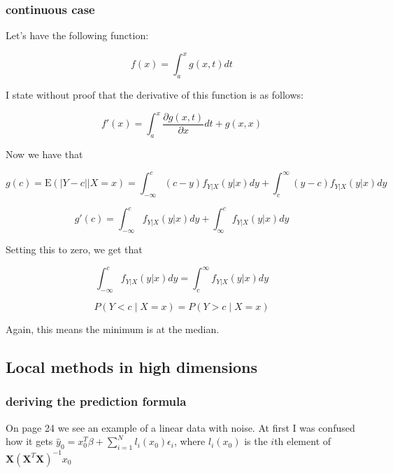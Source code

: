 \documentclass{article}
\begin{document}
\subsubsection{continuous case}

Let's have the following function:

\begin{equation}
    f(x) = \int_{a}^{x}g(x,t)dt
\end{equation}

I state without proof that the derivative of this function is as follows:

\begin{equation}
f'(x) = \int_{a}^{x} \frac{\partial g(x,t)}{\partial x} dt + g(x, x)
\end{equation}

Now we have that

\begin{equation}
    g(c) = \text{E}(|Y-c| | X=x) = \int_{-\infty}^{c}(c-y)f_{Y|X}(y|x)dy + \int_{c}^{\infty}(y-c)f_{Y|X}(y|x)dy
\end{equation}

\begin{equation}
    g'(c) = \int_{-\infty}^{c}f_{Y|X}(y|x)dy + \int_{\infty}^{c}f_{Y|X}(y|x)dy
\end{equation}

Setting this to zero, we get that

\begin{equation}
    \int_{-\infty}^{c}f_{Y|X}(y|x)dy = \int_{c}^{\infty}f_{Y|X}(y|x)dy
\end{equation}

\begin{equation}
    P(Y<c \mid X=x) = P(Y>c \mid X=x)
\end{equation}

Again, this means the minimum is at the median.


\newpage
\subsection{Local methods in high dimensions}

\subsubsection{deriving the prediction formula}

On page 24 we see an example of a linear data with noise. At first I was confused how it gets $\hat{y}_0 = x_0^T \beta + \sum_{i=1}^N l_i(x_0)\epsilon_i$, where $l_i(x_0)$ is the $i$th element of $\textbf{X}(\textbf{X}^T\textbf{X})^{-1}x_0$
\end{document}
